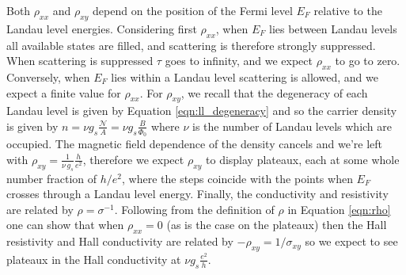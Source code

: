 \documentclass[edeposit,fullpage,draftthesis]{uiucthesis2009}
\begin{document}
        Both $\rho_{xx}$ and $\rho_{xy}$ depend on the position of the Fermi level $E_F$ relative to the Landau level
        energies. Considering first $\rho_{xx}$, when $E_F$ lies between Landau levels all available states are filled,
        and scattering is therefore strongly suppressed. When scattering is suppressed $\tau$ goes to infinity, and 
        we expect $\rho_{xx}$ to go to zero. Conversely, when $E_F$ lies within a Landau level scattering is allowed,
        and we expect a finite value for $\rho_{xx}$.
        For $\rho_{xy}$, we recall that the degeneracy of each Landau level is given by Equation \ref{eqn:ll_degeneracy}
        and so the carrier density is given by $n = \nu g_s \frac{\mathcal{N}}{A} = \nu g_s \frac{B}{\Phi_0}$ where $\nu$ 
        is the number of Landau levels which are occupied. The magnetic field dependence of the density cancels
        and we're left with $\rho_{xy} = \frac{1}{\nu\,g_s} \frac{h}{e^2}$,
        therefore we expect $\rho_{xy}$ to display plateaux, each at some whole number fraction of $h / e^2$, 
        where the steps coincide with the points when $E_F$ crosses through a Landau level energy.
        Finally, the conductivity and resistivity are related by $\rho = \sigma^{-1}$. Following from
        the definition of $\rho$ in Equation \ref{eqn:rho} one can show that when $\rho_{xx} = 0$
        (as is the case on the plateaux) then the Hall resistivity and Hall conductivity are related by
        $-\rho_{xy} = 1 / \sigma_{xy}$ so we expect to see plateaux in the Hall conductivity at $\nu g_s \frac{e^2}{h}$.
         
\end{document}
